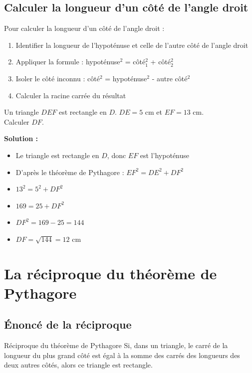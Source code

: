\subsection{Calculer la longueur d'un côté de l'angle droit}

\begin{methodebox}
Pour calculer la longueur d'un côté de l'angle droit :
\begin{enumerate}
    \item Identifier la longueur de l'hypoténuse et celle de l'autre côté de l'angle droit
    \item Appliquer la formule : hypoténuse$^2$ = côté$_1^2$ + côté$_2^2$
    \item Isoler le côté inconnu : côté$^2$ = hypoténuse$^2$ - autre côté$^2$
    \item Calculer la racine carrée du résultat
\end{enumerate}
\end{methodebox}

\begin{examplebox}
Un triangle $DEF$ est rectangle en $D$. $DE = 5$ cm et $EF = 13$ cm.\\
Calculer $DF$.

\textbf{Solution :}
\begin{itemize}
    \item Le triangle est rectangle en $D$, donc $EF$ est l'hypoténuse
    \item D'après le théorème de Pythagore : $EF^2 = DE^2 + DF^2$
    \item $13^2 = 5^2 + DF^2$
    \item $169 = 25 + DF^2$
    \item $DF^2 = 169 - 25 = 144$
    \item $DF = \sqrt{144} = 12$ cm
\end{itemize}
\end{examplebox}

\section{La réciproque du théorème de Pythagore}

\subsection{Énoncé de la réciproque}

\begin{proprietebox}{Réciproque du théorème de Pythagore}
Si, dans un triangle, le carré de la longueur du plus grand côté est égal à la somme des carrés des longueurs des deux autres côtés, alors ce triangle est rectangle.
\end{proprietebox}

